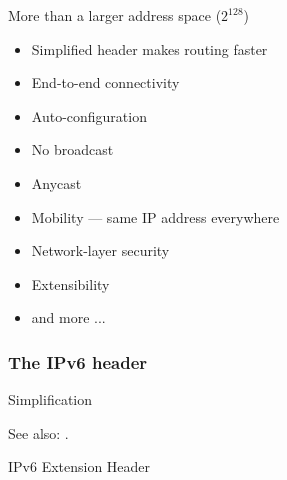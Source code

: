 \begin{frame}
  \begin{iblock}{More than a larger address space ($2^{128}$)}
    \begin{itemize}
    \item Simplified header makes routing faster
    \item End-to-end connectivity
    \item Auto-configuration
    \item No broadcast
    \item Anycast
    \item Mobility --- same IP address everywhere
    \item Network-layer security
    \item Extensibility
    \item and more ...
    \end{itemize}
  \end{iblock}
\end{frame}

\subsubsection{The IPv6 header}


\begin{frame}{Simplification}
  \begin{center}
  \end{center}
\end{frame}


See also: .

\begin{frame}{IPv6 Extension Header}
  \begin{center}
  \end{center}
\end{frame}


